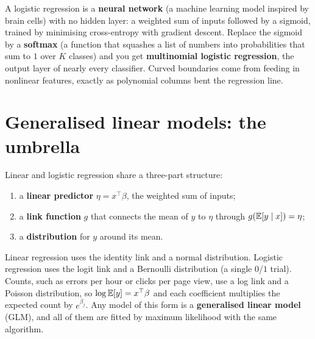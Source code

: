 \begin{connectionbox}
A logistic regression is a \textbf{neural network} (a machine learning model inspired by brain cells) with no hidden layer: a weighted sum of inputs
followed by a sigmoid, trained by minimising cross-entropy with gradient descent. Replace
the sigmoid by a \textbf{softmax} (a function that squashes a list of numbers into probabilities that sum to $1$ over $K$ classes) and you get \textbf{multinomial logistic regression},
the output layer of nearly every classifier. Curved boundaries come from feeding in
nonlinear features, exactly as polynomial columns bent the regression line.
\end{connectionbox}

\section{Generalised linear models: the umbrella}
\label{sec:glm}

Linear and logistic regression share a three-part structure:
\begin{enumerate}
  \item a \textbf{linear predictor} $\eta = x^\top\beta$, the weighted sum of inputs;
  \item a \textbf{link function} $g$ that connects the mean of $y$ to $\eta$ through
  $g(\operatorname{\mathbb{E}}[y\mid x]) = \eta$;
  \item a \textbf{distribution} for $y$ around its mean.
\end{enumerate}
Linear regression uses the identity link and a normal distribution. Logistic regression
uses the logit link and a Bernoulli distribution (a single $0$/$1$ trial). Counts, such as
errors per hour or clicks per page view, use a log link and a Poisson distribution, so
$\log\operatorname{\mathbb{E}}[y] = x^\top\beta$ and each coefficient multiplies the expected count by
$e^{\beta_j}$. Any model of this form is a \textbf{generalised linear model} (GLM), and
all of them are fitted by maximum likelihood with the same algorithm.

